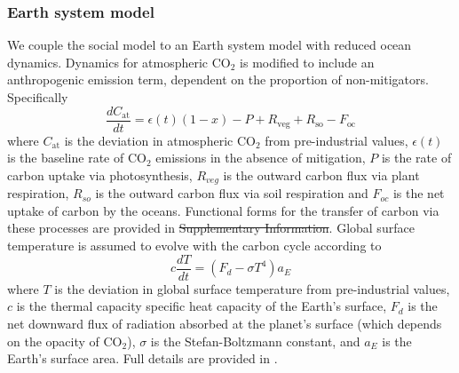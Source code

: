 \documentclass[10pt,letterpaper]{article}
\providecommand{\DIFaddtex}[1]{{\protect\color{blue}\uwave{#1}}} %
\providecommand{\DIFdeltex}[1]{{\protect\color{red}\sout{#1}}}                      %
\providecommand{\DIFaddbegin}{} %
\providecommand{\DIFaddend}{} %
\providecommand{\DIFdelbegin}{} %
\providecommand{\DIFdelend}{} %
\providecommand{\DIFadd}[1]{\texorpdfstring{\DIFaddtex{#1}}{#1}} %
\providecommand{\DIFdel}[1]{\texorpdfstring{\DIFdeltex{#1}}{}} %
\begin{document}
\subsubsection*{Earth system model} We couple the social model to an Earth system model\cite{lenton00} with reduced ocean dynamics\cite{muryshev15}. Dynamics for atmospheric $\text{CO}_2$ is modified to include an anthropogenic emission term, dependent on the proportion of non-mitigators. Specifically
\begin{equation}
\frac{dC_{\text{at}}}{dt} = \epsilon(t)(1-x) -P + R_{\text{veg}} + R_{\text{so}} - F_{\text{oc}} \label{eq:model_cat}
\end{equation}
where $C_{\text{at}}$ is the deviation in atmospheric $\text{CO}_2$ from pre-industrial values, $\epsilon(t)$ is the baseline rate of $\text{CO}_2$ emissions in the absence of mitigation, $P$ is the rate of carbon uptake via photosynthesis, $R_{veg}$ is the outward carbon flux via plant respiration, $R_{so}$ is the outward carbon flux via soil respiration and $F_{oc}$ is the net uptake of carbon by the oceans. Functional forms for the transfer of carbon via these processes are provided in \DIFdelbegin \DIFdel{Supplementary Information}\DIFdelend \DIFaddbegin \DIFadd{S1 Text}\DIFaddend . Global surface temperature is assumed to evolve with the carbon cycle according to \cite{lenton00}
\begin{equation}
c\frac{dT}{dt}  = (F_d - \sigma T^4)a_E \label{eq:model_t}
\end{equation}
where $T$ is the deviation in global surface temperature from pre-industrial values, $c$ is the thermal capacity specific heat capacity of the Earth's surface, $F_d$ is the net downward flux of radiation absorbed at the planet's surface (which depends on the opacity of $\text{CO}_2$), $\sigma$ is the Stefan-Boltzmann constant, and $a_E$ is the Earth's surface area. Full details are provided in .

\end{document}
